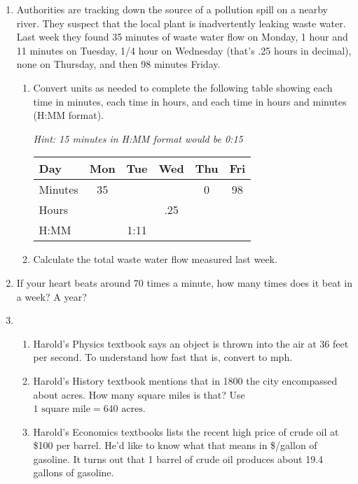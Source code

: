 \begin{enumerate}
\item Authorities are tracking down the source of a pollution spill on a nearby river.  They suspect that the local plant is inadvertently leaking waste water.  Last week they found 35 minutes of waste water flow on Monday, 1 hour and 11 minutes on Tuesday, 1/4 hour on Wednesday (that's .25 hours in decimal), none on Thursday, and then 98 minutes Friday.
\begin{enumerate}
\item Convert units as needed to complete the following table showing each time in minutes, each time in hours, and each time in hours and minutes (H:MM format). 

\emph{Hint:  15 minutes in H:MM format would be 0:15}
\begin{center}
\begin{tabular} {|l |c|c|c |c|c|} \hline
Day & Mon & Tue & Wed & Thu & Fri \\ \hline
Minutes & 35 & && 0 & 98 \\ \hline
Hours & \hspace{.5in}~ &\hspace{.5in}~ &.25&\hspace{.5in}~ &\hspace{.5in}~  \\ \hline
H:MM & & 1:11 & \hspace{.5in}~   & &  \\ \hline
\end{tabular}
\end{center}
\item Calculate the total waste water flow measured last week. 
\end{enumerate}

\item If your heart beats around 70 times a minute, how many times does it beat in a week?  A year?

\item \begin{enumerate}
\item Harold's Physics textbook says an object is thrown into the air at 36 feet per second.  To understand how fast that is, convert to mph.
\item Harold's History textbook mentions that in 1800 the city encompassed about  acres.  How many square miles is that?  Use $1 \text{ square mile} = 640 \text{ acres}$.
\item Harold's Economics textbooks lists the recent high price of crude oil at \$100 per barrel.  He'd like to know what that means in \$/gallon of gasoline.  It turns out that 1 barrel of crude oil produces about 19.4 gallons of gasoline. 
\end{enumerate}




\end{enumerate}
